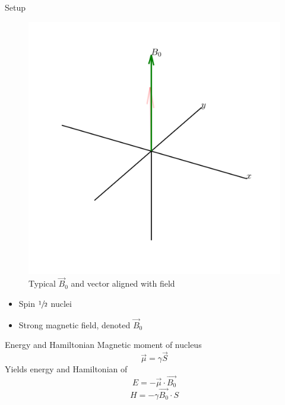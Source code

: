 \documentclass[aspectratio=169,xcolor=dvipsnames]{beamer}
\newcommand{\half}{$\sfrac{1}{2}$ }
\newcommand{\Bnot}{\vec{B}_0}
\begin{document}
\begin{frame}{Setup}
    

    \begin{minipage}{0.4\linewidth}
        \begin{figure}
            \centering
            \includegraphics[width = \linewidth]{figs/setup.png}
            \caption{Typical $\Bnot$ and vector aligned with field}
        \end{figure}
    \end{minipage}
    \hfill
    \begin{minipage}{0.5\linewidth}
        \begin{itemize}
            \item Spin \half nuclei 
            \item Strong magnetic field, denoted $\Bnot$
        \end{itemize}
        \begin{block}{Energy and Hamiltonian}
            Magnetic moment of nucleus
            \begin{equation}
                \vec{\mu} = \gamma \vec{S}
            \end{equation}
            Yields energy and Hamiltonian of 
            \begin{equation}
                E = -\vec{\mu} \cdot \vec{B_0}
            \end{equation}
            \begin{equation}\label{eqn:base-hamiltonian}
                H = -\gamma \vec{B_0} \cdot S
            \end{equation}
        \end{block}
    \end{minipage}
    

\end{frame}
\end{document}
